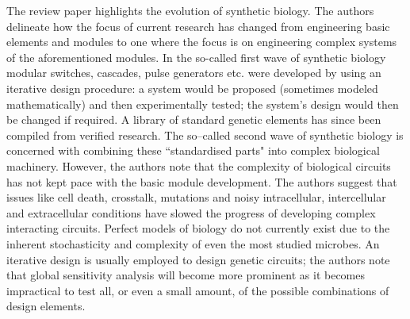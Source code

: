 \documentclass[float=false, crop=false]{standalone}
\begin{document}
	The review paper \cite{Purnick2009} highlights the evolution of synthetic biology. The authors delineate how the focus of current research has changed from engineering basic elements and modules to one where the focus is on engineering complex systems of the aforementioned modules. In the so-called first wave of synthetic biology modular switches, cascades, pulse generators etc. were developed by using an iterative design procedure: a system would be proposed (sometimes modeled mathematically) and then experimentally tested; the system's design would then be changed if required. A library of standard genetic elements has since been compiled from verified research. The so--called second wave of synthetic biology is concerned with combining these ``standardised parts" into complex biological machinery. However, the authors note that the complexity of biological circuits has not kept pace with the basic module development. The authors suggest that issues like cell death, crosstalk, mutations and noisy intracellular, intercellular and extracellular conditions have slowed the progress of developing complex interacting circuits. Perfect models of biology do not currently exist due to the inherent stochasticity and complexity of even the most studied microbes. An iterative design is usually employed to design genetic circuits; the authors note that global sensitivity analysis will become more prominent as it becomes impractical to test all, or even a small amount, of the possible combinations of design elements.

	\ifstandalone
			
		
	\fi
\end{document}
